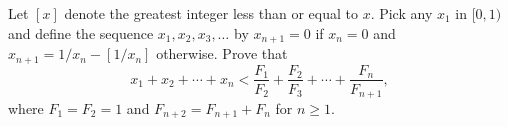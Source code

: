 Let $[x]$ denote the greatest integer less than or equal to $x$. Pick any $x_1$ in $[0,1)$ and define the sequence $x_1, x_2, x_3, \ldots$ by $x_{n+1} = 0$ if $x_n = 0$ and $x_{n+1} = 1/x_n - [1/x_n]$ otherwise. Prove that
\[ x_1 + x_2 + \cdots + x_n < \frac{F_1}{F_2} + \frac{F_2}{F_3} + \cdots + \frac{F_n}{F_{n+1}}, \]
where $F_1 = F_2 = 1$ and $F_{n+2} = F_{n+1} + F_n$ for $n \geq 1$.
